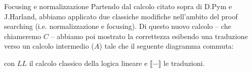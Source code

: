 \documentclass{beamer}
\begin{document}
% 

\begin{frame}{Focusing e normalizzazione}
	Partendo dal calcolo citato sopra di D.Pym e J.Harland, abbiamo applicato due classiche modifiche nell'ambito del proof searching (i.e. normalizzazione e focusing).
	Di questo nuovo calcolo -- che chiameremo $C$ -- abbiamo poi mostrato la correttezza esibendo una traduzione verso un calcolo intermedio ($A$) tale che il seguente diagramma commuta:
	\begin{center}
	\end{center}
	con $LL$ il calcolo classico della logica lineare e $\llbracket - \rrbracket$ le traduzioni.
\end{frame}
\end{document}
